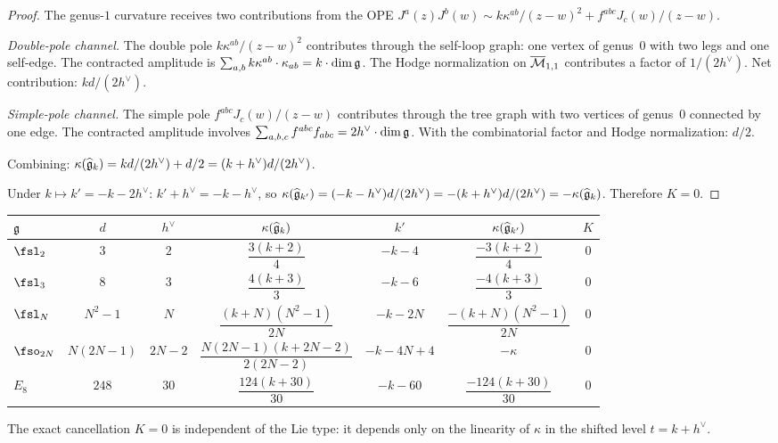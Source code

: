 \begin{proof}
The genus-$1$ curvature receives two contributions from the OPE
$J^a(z)J^b(w) \sim k\kappa^{ab}/(z-w)^2 + f^{abc}J_c(w)/(z-w)$.

\emph{Double-pole channel.}
The double pole $k\kappa^{ab}/(z-w)^2$ contributes through the
self-loop graph: one vertex of genus~$0$ with two legs and one
self-edge. The contracted amplitude is
$\sum_{a,b} k\kappa^{ab} \cdot \kappa_{ab} = k \cdot \dim\mathfrak{g}$.
The Hodge normalization on $\overline{\mathcal{M}}_{1,1}$ contributes a factor
of $1/(2h^\vee)$. Net contribution: $kd/(2h^\vee)$.

\emph{Simple-pole channel.}
The simple pole $f^{abc}J_c(w)/(z-w)$ contributes through the tree
graph with two vertices of genus~$0$ connected by one edge. The
contracted amplitude involves
$\sum_{a,b,c} f^{abc}f_{abc} = 2h^\vee \cdot \dim\mathfrak{g}$.
With the combinatorial factor and Hodge normalization: $d/2$.

Combining: $\kappa(\widehat{\mathfrak{g}}_k)
= kd/(2h^\vee) + d/2 = (k + h^\vee)d/(2h^\vee)$.

Under $k \mapsto k' = -k - 2h^\vee$:
$k' + h^\vee = -k - h^\vee$, so
$\kappa(\widehat{\mathfrak{g}}_{k'})
= (-k - h^\vee)d/(2h^\vee) = -(k + h^\vee)d/(2h^\vee) = -\kappa(\widehat{\mathfrak{g}}_k)$.
Therefore $K = 0$.
\end{proof}

\begin{computation}
\label{comp:thqg-IV-km-classical}
\renewcommand{\arraystretch}{1.4}
\begin{center}
\begin{tabular}{lcccccc}
\toprule
$\mathfrak{g}$ & $d$ & $h^\vee$ & $\kappa(\widehat{\mathfrak{g}}_k)$ & $k'$ &
$\kappa(\widehat{\mathfrak{g}}_{k'})$ & $K$ \\
\midrule
$\fsl_2$ & $3$ & $2$ & $\dfrac{3(k+2)}{4}$ & $-k-4$ &
$\dfrac{-3(k+2)}{4}$ & $0$ \\[6pt]
$\fsl_3$ & $8$ & $3$ & $\dfrac{4(k+3)}{3}$ & $-k-6$ &
$\dfrac{-4(k+3)}{3}$ & $0$ \\[6pt]
$\fsl_N$ & $N^2{-}1$ & $N$ & $\dfrac{(k{+}N)(N^2{-}1)}{2N}$ & $-k-2N$ &
$\dfrac{-(k{+}N)(N^2{-}1)}{2N}$ & $0$ \\[6pt]
$\fso_{2N}$ & $N(2N{-}1)$ & $2N{-}2$ & $\dfrac{N(2N{-}1)(k{+}2N{-}2)}{2(2N{-}2)}$ & $-k-4N+4$ &
$-\kappa$ & $0$ \\[6pt]
$E_8$ & $248$ & $30$ & $\dfrac{124(k+30)}{30}$ & $-k-60$ &
$\dfrac{-124(k+30)}{30}$ & $0$ \\
\bottomrule
\end{tabular}
\end{center}
The exact cancellation $K = 0$ is independent of the Lie type: it depends
only on the linearity of $\kappa$ in the shifted level $t = k + h^\vee$.
\end{computation}


